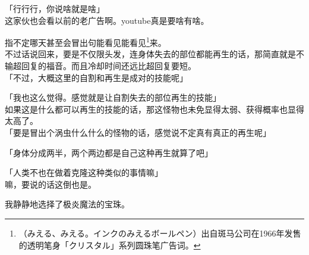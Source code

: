 「行行行，你说啥就是啥」\\

这家伙也会看以前的老广告啊。youtube真是要啥有啥。

指不定哪天甚至会冒出句能看见能看见\footnote{（みえる、みえる。インクのみえるボールペン）出自斑马公司在1966年发售的透明笔身「クリスタル」系列圆珠笔广告词。}来。\\

不过话说回来，要是不仅限头发，连身体失去的部位都能再生的话，那简直就是不输超回复的福音。而且冷却时间还远比超回复要短。\\

「不过，大概这里的自割和再生是成对的技能呢」

「我也这么觉得。感觉就是让自割失去的部位再生的技能」\\

如果这是什么都可以再生的技能的话，那这怪物也未免显得太弱、获得概率也显得太高了。\\

「要是冒出个涡虫什么什么的怪物的话，感觉说不定真有真正的再生呢」

「身体分成两半，两个两边都是自己这种再生就算了吧」

「人类不也在做着克隆这种类似的事情嘛」\\

嘛，要说的话这倒也是。

我静静地选择了极炎魔法的宝珠。\\


